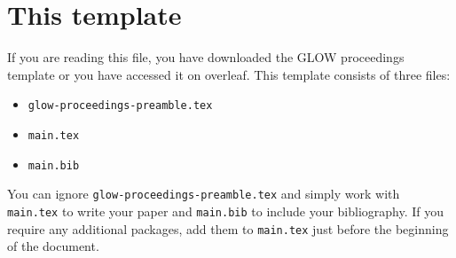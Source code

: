 




\newcommand{\fulltitle}{GLOW proceedings template}
\newcommand{\shorttitle}{GLOW proceedings template}
\newcommand{\authorlast}{Bárány}


\author{%
    András Bárány, Bielefeld University\\
}

\usepackage{minted}
\usepackage{layout}



\maketitle

\begin{abstract}
    \noindent\textbf{Abstract:} This style sheet illustrates the GLOW proceedings
    \LaTeX{} templates and describes how to use it.\\

    \noindent\textbf{Keywords:} \emph{keyword 1}, \emph{keyword 2}, \emph{keyword 3}
\end{abstract}

\section{This template}

If you are reading this file, you have downloaded the GLOW proceedings template
or you have accessed it on overleaf. This template consists of three files:

\begin{itemize}
    \item \texttt{glow-proceedings-preamble.tex}
    \item \texttt{main.tex}
    \item \texttt{main.bib}
\end{itemize}

You can ignore \texttt{glow-proceedings-preamble.tex} and simply work with
\texttt{main.tex} to write your paper and \texttt{main.bib} to include your
bibliography. If you require any additional packages, add them to
\texttt{main.tex} just before the beginning of the document.


